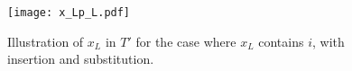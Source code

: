 

\begin{figure}[tbh]
  \centering
  \texttt{[image: x\_Lp\_L.pdf]}
  \caption{Illustration of $x_L$ in $T'$ for the case where $x_L$ contains $i$, with insertion and substitution.}
  \label{fig:x_Lp_L}
\end{figure}


